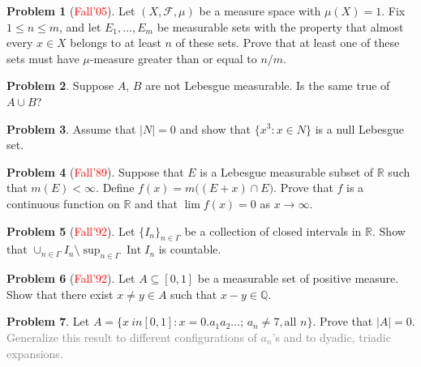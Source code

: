 \documentclass[12pt]{amsart}
\def\field#1{\mathbb{#1}}
\def\abs#1{\lvert {#1} \rvert}
\theoremstyle{definition}
\newtheorem{problem}{Problem}
\theoremstyle{remark}
\begin{document}
\begin{problem}[\textcolor{red}{Fall'05}]
  Let $(X, \mathcal{F}, \mu)$ be a measure space with $\mu(X)=1$.  Fix
  $1 \leq n \leq m$, and let $E_1, \dotsc, E_m$ be measurable sets
  with the property that almost every $x \in X$ belongs to at least
  $n$ of these sets.  Prove that at least one of these sets must have
  $\mu$-measure greater than or equal to $n/m$.
\end{problem}
\begin{problem}
  Suppose $A$, $B$ are not Lebesgue measurable.  Is the same true of
  $A\cup B$?
\end{problem}
\begin{problem}
  Assume that $\abs{N} = 0$ and show that $\{ x^3 : x \in N\}$ is a
  null Lebesgue set.
\end{problem}
\begin{problem}[\textcolor{red}{Fall'89}]
  Suppose that $E$ is a Lebesgue measurable subset of $\field{R}$ such
  that $m(E)<\infty$.  Define $f(x) = m\big( (E+x) \cap E \big)$.
  Prove that $f$ is a continuous function on $\field{R}$ and that
  $\lim f(x) = 0$ as $x \to \infty$.
\end{problem}
\begin{problem}[\textcolor{red}{Fall'92}]
  Let $\{ I_n \}_{n \in \Gamma}$ be a collection of closed intervals
  in $\field{R}$.  Show that $\cup_{n \in \Gamma} I_n \setminus
  \sup_{n \in \Gamma} \operatorname{Int}{I}_n$ is countable.
\end{problem}
\begin{problem}[\textcolor{red}{Fall'92}]
  Let $A \subseteq [0,1]$ be a measurable set of positive measure.
  Show that there exist $x \neq y \in A$ such that $x-y \in
  \field{Q}$.
\end{problem}
\begin{problem}
  Let $A = \{ x\ in [0,1] : x = 0.a_1a_2\dotsc;\, a_n \neq 7, \text{
    all }n\}$.  Prove that $\abs{A} = 0$.  \textcolor{gray}{Generalize
    this result to different configurations of $a_n$'s and to dyadic,
    triadic expansions.}
\end{problem}
\end{document}
